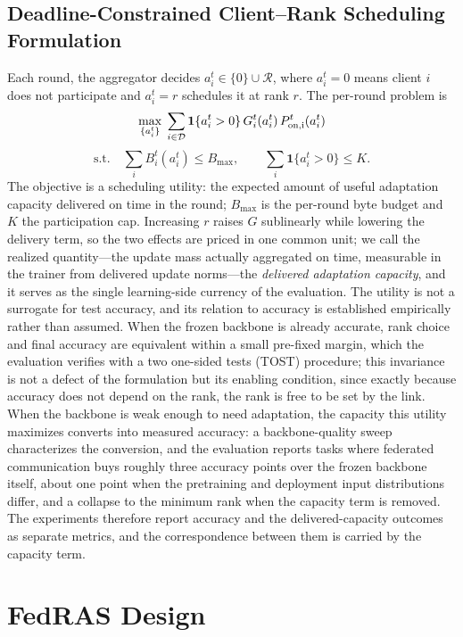 \documentclass[a4paper,fleqn]{cas-dc}
\begin{document}
\subsection{Deadline-Constrained Client--Rank Scheduling Formulation}
\label{sec:problem}
Each round, the aggregator decides $a_i^t\in\{0\}\cup\mathcal R$, where $a_i^t=0$ means client $i$ does not participate and $a_i^t=r$ schedules it at rank $r$. The per-round problem is
\begin{equation}
\max_{\{a_i^t\}}\;\sum_{i\in\mathcal D}\mathbf 1\{a_i^t>0\}\,G_i^t(a_i^t)\,P_{\rm on,i}^t(a_i^t)
\label{eq:objective}
\end{equation}
\begin{equation}
\text{s.t.}\quad \sum_i B_i^t(a_i^t)\le B_{\max},\qquad \sum_i\mathbf 1\{a_i^t>0\}\le K .
\label{eq:constraints}
\end{equation}
The objective is a scheduling utility: the expected amount of useful adaptation capacity delivered on time in the round; $B_{\max}$ is the per-round byte budget and $K$ the participation cap. Increasing $r$ raises $G$ sublinearly while lowering the delivery term, so the two effects are priced in one common unit; we call the realized quantity---the update mass actually aggregated on time, measurable in the trainer from delivered update norms---the \emph{delivered adaptation capacity}, and it serves as the single learning-side currency of the evaluation. The utility is not a surrogate for test accuracy, and its relation to accuracy is established empirically rather than assumed. When the frozen backbone is already accurate, rank choice and final accuracy are equivalent within a small pre-fixed margin, which the evaluation verifies with a two one-sided tests (TOST) procedure; this invariance is not a defect of the formulation but its enabling condition, since exactly because accuracy does not depend on the rank, the rank is free to be set by the link. When the backbone is weak enough to need adaptation, the capacity this utility maximizes converts into measured accuracy: a backbone-quality sweep characterizes the conversion, and the evaluation reports tasks where federated communication buys roughly three accuracy points over the frozen backbone itself, about one point when the pretraining and deployment input distributions differ, and a collapse to the minimum rank when the capacity term is removed. The experiments therefore report accuracy and the delivered-capacity outcomes as separate metrics, and the correspondence between them is carried by the capacity term.
\section{FedRAS Design}
\label{sec:solver}
\end{document}
